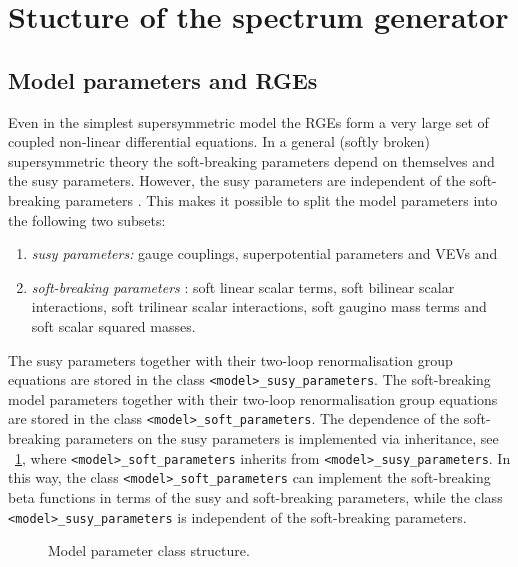 \documentclass[final,3p,times,pdflatex]{elsarticle}
\newcommand{\code}[1]{\lstinline|#1|}  %
\begin{document}
\section{Stucture of the spectrum generator}

\subsection{Model parameters and RGEs}
Even in the simplest supersymmetric model the RGEs form a very large
set of coupled non-linear differential equations.  In a general
(softly broken) supersymmetric theory the soft-breaking parameters
depend on themselves and the susy parameters.  However, the susy
parameters are independent of the soft-breaking parameters
\cite{Jones:1974pg,Jones:1983vk,West:1984dg,Martin:1993yx,Yamada:1993ga,MV94,Fonseca:2011vn,Sperling:2013eva,Sperling:2013xqa}.
This makes it possible to split the model parameters into the
following two subsets:
%
\begin{enumerate}
\item \emph{susy parameters:} gauge couplings, superpotential
  parameters and VEVs and
\item \emph{soft-breaking parameters} \cite{Girardello:1981wz}: soft
  linear scalar terms, soft bilinear scalar interactions, soft
  trilinear scalar interactions, soft gaugino mass terms and soft
  scalar squared masses.
\end{enumerate}
%
The susy parameters together with their two-loop renormalisation group
equations are stored in the class \code{<model>_susy_parameters}.  The
soft-breaking model parameters together with their two-loop
renormalisation group equations are stored in the class
\code{<model>_soft_parameters}.  The dependence of the soft-breaking
parameters on the susy parameters is implemented via inheritance, see
\figurename~\ref{fig:parameter-classes}, where
\code{<model>_soft_parameters} inherits from
\code{<model>_susy_parameters}.  In this way, the class
\code{<model>_soft_parameters} can implement the soft-breaking beta
functions in terms of the susy and soft-breaking parameters, while the
class \code{<model>_susy_parameters} is independent of the
soft-breaking parameters.
%
\begin{figure}
  \centering
  \caption{Model parameter class structure.}
  \label{fig:parameter-classes}
\end{figure}
\end{document}
